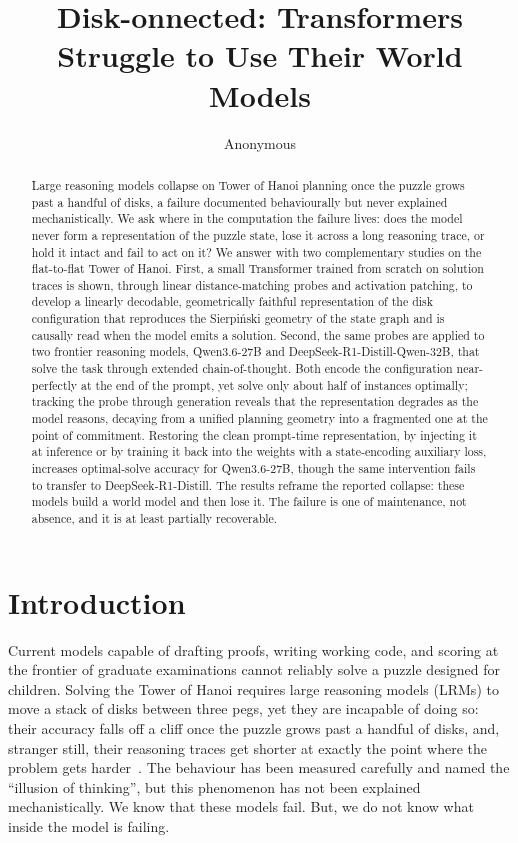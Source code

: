 \documentclass{article} %
\title{Disk-onnected: Transformers Struggle to Use Their World Models}
\author{Anonymous}
\begin{document}
\ifcolmsubmission
\linenumbers
\fi

\maketitle


\begin{abstract}
Large reasoning models collapse on Tower of Hanoi planning once the puzzle grows past a handful of disks, a failure documented behaviourally but never explained mechanistically. We ask where in the computation the failure lives: does the model never form a representation of the puzzle state, lose it across a long reasoning trace, or hold it intact and fail to act on it? We answer with two complementary studies on the flat-to-flat Tower of Hanoi. First, a small Transformer trained from scratch on solution traces is shown, through linear distance-matching probes and activation patching, to develop a linearly decodable, geometrically faithful representation of the disk configuration that reproduces the Sierpi\'nski geometry of the state graph and is causally read when the model emits a solution. Second, the same probes are applied to two frontier reasoning models, Qwen3.6-27B and DeepSeek-R1-Distill-Qwen-32B, that solve the task through extended chain-of-thought. Both encode the configuration near-perfectly at the end of the prompt, yet solve only about half of instances optimally; tracking the probe through generation reveals that the representation degrades as the model reasons, decaying from a unified planning geometry into a fragmented one at the point of commitment. Restoring the clean prompt-time representation, by injecting it at inference or by training it back into the weights with a state-encoding auxiliary loss, increases optimal-solve accuracy for Qwen3.6-27B, though the same intervention fails to transfer to DeepSeek-R1-Distill. The results reframe the reported collapse: these models build a world model and then lose it. The failure is one of maintenance, not absence, and it is at least partially recoverable.
\end{abstract}

\section{Introduction}
\label{sec:introduction}

Current models capable of drafting proofs, writing working code, and scoring at the frontier of graduate examinations cannot reliably solve a puzzle designed for children. Solving the Tower of Hanoi requires large reasoning models (LRMs) to move a stack of disks between three pegs, yet they are incapable of doing so: their accuracy falls off a cliff once the puzzle grows past a handful of disks, and, stranger still, their reasoning traces get shorter at exactly the point where the problem gets harder~\citep{shojaee2025illusion}. The behaviour has been measured carefully and named the \enquote{illusion of thinking}, but this phenomenon has not been explained mechanistically. We know that these models fail. But, we do not know what inside the model is failing.
\end{document}
